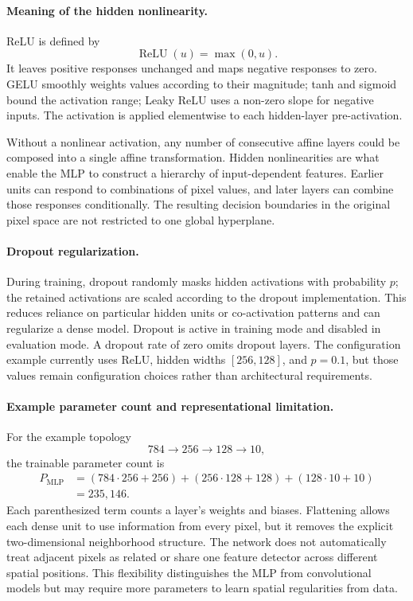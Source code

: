 \documentclass[11pt,a4paper]{article}
\begin{document}
\paragraph{Meaning of the hidden nonlinearity.} ReLU is defined by
\[
\operatorname{ReLU}(u)=\max(0,u).
\]
It leaves positive responses unchanged and maps negative responses to zero. GELU smoothly weights values according to their magnitude; tanh and sigmoid bound the activation range; Leaky ReLU uses a non-zero slope for negative inputs. The activation is applied elementwise to each hidden-layer pre-activation.

Without a nonlinear activation, any number of consecutive affine layers could be composed into a single affine transformation. Hidden nonlinearities are what enable the MLP to construct a hierarchy of input-dependent features. Earlier units can respond to combinations of pixel values, and later layers can combine those responses conditionally. The resulting decision boundaries in the original pixel space are not restricted to one global hyperplane.

\paragraph{Dropout regularization.} During training, dropout randomly masks hidden activations with probability \(p\); the retained activations are scaled according to the dropout implementation. This reduces reliance on particular hidden units or co-activation patterns and can regularize a dense model. Dropout is active in training mode and disabled in evaluation mode. A dropout rate of zero omits dropout layers. The configuration example currently uses ReLU, hidden widths \([256,128]\), and \(p=0.1\), but those values remain configuration choices rather than architectural requirements.

\paragraph{Example parameter count and representational limitation.} For the example topology
\[
784\rightarrow256\rightarrow128\rightarrow10,
\]
the trainable parameter count is
\begin{align*}
P_{\mathrm{MLP}}
&=(784\cdot256+256)
 +(256\cdot128+128)
 +(128\cdot10+10)\\
&=235{,}146.
\end{align*}
Each parenthesized term counts a layer's weights and biases. Flattening allows each dense unit to use information from every pixel, but it removes the explicit two-dimensional neighborhood structure. The network does not automatically treat adjacent pixels as related or share one feature detector across different spatial positions. This flexibility distinguishes the MLP from convolutional models but may require more parameters to learn spatial regularities from data.
\end{document}
